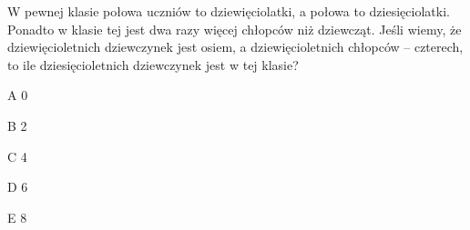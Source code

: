 \begin{tresc}
W pewnej klasie połowa uczniów to dziewięciolatki, a połowa to dziesięciolatki. Ponadto w klasie tej jest dwa razy więcej chłopców niż dziewcząt. Jeśli wiemy, że dziewięcioletnich dziewczynek jest osiem, a dziewięcioletnich chłopców – czterech, to ile dziesięcioletnich dziewczynek jest w tej klasie?
\end{tresc}
\begin{wariant}{A} 0 \end{wariant}
\begin{wariant}{B} 2 \end{wariant}
\begin{wariant}{C} 4 \end{wariant}
\begin{wariant}{D} 6 \end{wariant}
\begin{wariant}{E} 8 \end{wariant}
